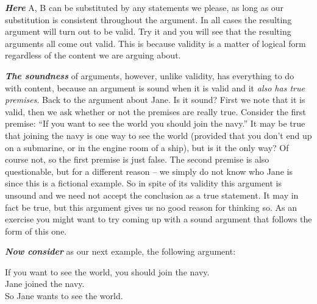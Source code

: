 \documentclass[12pt, openany]{book}
\begin{document}
\textbf{\emph{Here}} A, B can be substituted by any statements we please, as long as our substitution is consistent throughout the argument. In all cases the resulting argument will turn out to be valid. Try it and you will see that the resulting arguments all come out valid. This is because validity is a matter of logical form regardless of the content we are arguing about.

\textbf{\emph{The soundness}} of arguments, however, unlike validity, has everything to do with content, because an argument is sound when it is valid and it \emph{also has true premises}. Back to the argument about Jane. Is it sound? First we note that it is valid, then we ask whether or not the premises are really true. Consider the first premise: ``If you want to see the world you should join the navy.'' It may be true that joining the navy is one way to see the world (provided that you don't end up on a submarine, or in the engine room of a ship), but is it the only way? Of course not, so the first premise is just false. The second premise is also questionable, but for a different reason -- we simply do not know who Jane is since this is a fictional example. So in spite of its validity this argument is unsound and we need not accept the conclusion as a true statement. It may in fact be true, but this argument gives us no good reason for thinking so. As an exercise you might want to try coming up with a sound argument that follows the form of this one.

\textbf{\emph{Now consider}} as our next example, the following argument:

\begin{center}

\begin{argument}

If you want to see the world, you should join the navy.\\
Jane joined the navy.\\

So Jane wants to see the world.

\end{argument}

\end{center}
\end{document}
